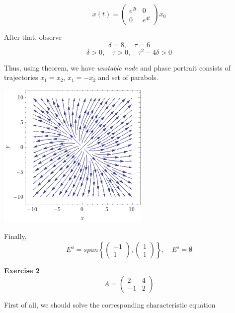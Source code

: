 \documentclass[12pt]{article}
\begin{document}
    $$
        x(t) = 
        \begin{pmatrix}
            e^{2t} & 0\\
            0 & e^{4t}
        \end{pmatrix}
        x_0
    $$

    After that, observe
    $$
        \delta = 8,\quad\tau = 6
    $$
    $$
        \delta > 0,\quad\tau > 0,\quad
        \tau^2-4\delta>0
    $$

    Thus, using theorem, we have \textit{unstable node} 
    and phase portrait consists of trajectories
    $x_1 = x_2$, $x_1 = -x_2$ and set of parabols.

    \begin{center}
        \includegraphics[scale=0.75]{plot1.png}
    \end{center}

    Finally,
    $$
        E^u = span
        \left\{ 
            \begin{pmatrix}
                -1\\
                1
            \end{pmatrix},
            \begin{pmatrix}
                1\\
                1
            \end{pmatrix}
        \right\},
        \quad
        E^s=\emptyset
    $$


    \textbf{Exercise 2}
    $$
        A =
        \begin{pmatrix}
            2 & 4\\
            -1 & 2
        \end{pmatrix}
    $$

    First of all, we should solve the corresponding
    characteristic equation
\end{document}
